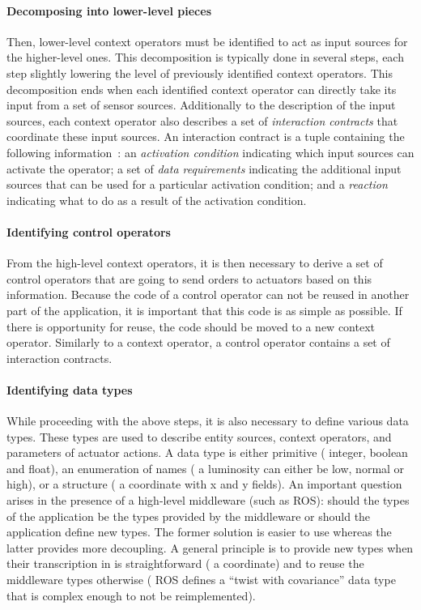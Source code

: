 \paragraph{Decomposing into lower-level pieces}
Then, lower-level context operators must be identified to act as input
sources for the higher-level ones. This decomposition is typically
done in several steps, each step slightly lowering the level of
previously identified context operators. This decomposition ends when
each identified context operator can directly take its input from a
set of sensor sources. Additionally to the description of the input
sources, each context operator also describes a set of
\emph{interaction contracts} that coordinate these input sources. An
interaction contract is a tuple containing the following
information~\cite{Cass11a}: an \emph{activation condition} indicating
which input sources can activate the operator; a set of \emph{data
  requirements} indicating the additional input sources that can be
used for a particular activation condition; and a \emph{reaction}
indicating what to do as a result of the activation condition.

\paragraph{Identifying control operators}
From the high-level context operators, it is then necessary to derive
a set of control operators that are going to send orders to actuators
based on this information. Because the code of a control operator can
not be reused in another part of the application, it is important that
this code is as simple as possible. If there is opportunity for reuse,
the code should be moved to a new context operator. Similarly to a
context operator, a control operator contains a set of interaction
contracts.

\paragraph{Identifying data types}
While proceeding with the above steps, it is also necessary to define
various data types. These types are used to describe entity sources,
context operators, and parameters of actuator actions. A data type is
either primitive (\eg{} integer, boolean and float), an enumeration of
names (\eg{} a luminosity can either be low, normal or high), or a
structure (\eg{} a coordinate with x and y fields). An important
question arises in the presence of a high-level middleware
(such as ROS): should the types of the application be the types
provided by the middleware or should the application define
new types. The former solution is easier to use whereas the latter
provides more decoupling. A general principle is to provide new types
when their transcription in \diaspec{} is straightforward (\eg{} a
coordinate) and to reuse the middleware types otherwise (\eg{}
ROS defines a ``twist with covariance'' data type that is complex
enough to not be reimplemented).

